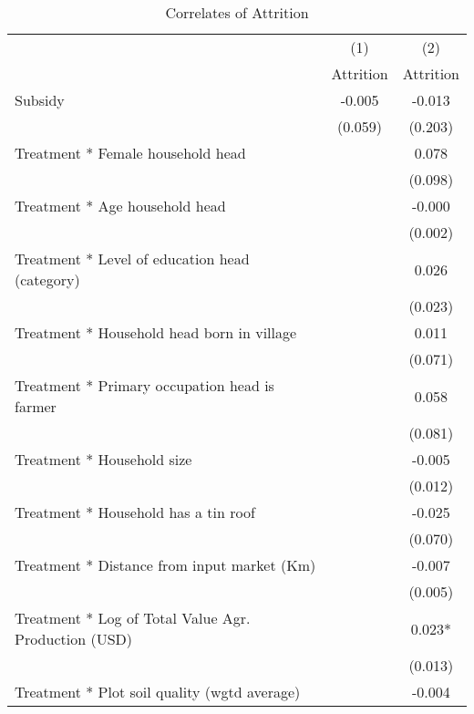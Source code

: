 \begin{table}[htbp]\centering
\def\sym#1{\ifmmode^{#1}\else\(^{#1}\)\fi}
\caption{Correlates of Attrition \label{tab:n2aimpact:attr}}
\begin{tabular}{l*{2}{c}}
\hline\hline
                    &\multicolumn{1}{c}{(1)}   &\multicolumn{1}{c}{(2)}   \\
                    &   Attrition   &   Attrition   \\
\hline
Subsidy             &      -0.005   &      -0.013   \\
                    &     (0.059)   &     (0.203)   \\
Treatment * Female household head&               &       0.078   \\
                    &               &     (0.098)   \\
Treatment * Age household head&               &      -0.000   \\
                    &               &     (0.002)   \\
Treatment * Level of education head (category)&               &       0.026   \\
                    &               &     (0.023)   \\
Treatment * Household head born in village&               &       0.011   \\
                    &               &     (0.071)   \\
Treatment * Primary occupation head is farmer&               &       0.058   \\
                    &               &     (0.081)   \\
Treatment * Household size&               &      -0.005   \\
                    &               &     (0.012)   \\
Treatment * Household has a tin roof&               &      -0.025   \\
                    &               &     (0.070)   \\
Treatment * Distance from input market (Km)&               &      -0.007   \\
                    &               &     (0.005)   \\
Treatment * Log of Total Value Agr. Production (USD)&               &       0.023*  \\
                    &               &     (0.013)   \\
Treatment * Plot soil quality (wgtd average) &               &      -0.004   \\

\end{tabular}
\end{table}

